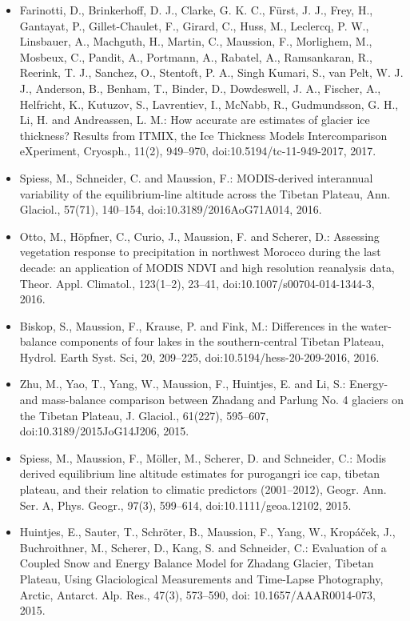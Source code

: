 \begin{footnotesize}
\begin{itemize}[nosep]
\item {} 
Farinotti, D., Brinkerhoff, D. J., Clarke, G. K. C., Fürst, J. J., Frey, H., Gantayat, P., Gillet-Chaulet, F., Girard,
C., Huss, M., Leclercq, P. W., Linsbauer, A., Machguth, H., Martin, C., Maussion, F., Morlighem, M., Mosbeux, C.,
Pandit, A., Portmann, A., Rabatel, A., Ramsankaran, R., Reerink, T. J., Sanchez, O., Stentoft, P. A., Singh Kumari,
S., van Pelt, W. J. J., Anderson, B., Benham, T., Binder, D., Dowdeswell, J. A., Fischer, A., Helfricht, K., Kutuzov,
S., Lavrentiev, I., McNabb, R., Gudmundsson, G. H., Li, H. and Andreassen, L. M.: How accurate are estimates of
glacier ice thickness? Results from ITMIX, the Ice Thickness Models Intercomparison eXperiment, Cryosph., 11(2),
949--970, doi:10.5194/tc-11-949-2017, 2017.

\item {} 
Spiess, M., Schneider, C. and Maussion, F.: MODIS-derived interannual variability of the equilibrium-line altitude
across the Tibetan Plateau, Ann. Glaciol., 57(71), 140--154, doi:10.3189/2016AoG71A014, 2016.

\item {} 
Otto, M., Höpfner, C., Curio, J., Maussion, F. and Scherer, D.: Assessing vegetation response to precipitation in
northwest Morocco during the last decade: an application of MODIS NDVI and high resolution reanalysis data, Theor.
Appl. Climatol., 123(1--2), 23--41, doi:10.1007/s00704-014-1344-3, 2016.

\item {} 
Biskop, S., Maussion, F., Krause, P. and Fink, M.: Differences in the water-balance components of four lakes in the
southern-central Tibetan Plateau, Hydrol. Earth Syst. Sci, 20, 209--225, doi:10.5194/hess-20-209-2016, 2016.

\item {} 
Zhu, M., Yao, T., Yang, W., Maussion, F., Huintjes, E. and Li, S.: Energy- and mass-balance comparison between Zhadang
and Parlung No. 4 glaciers on the Tibetan Plateau, J. Glaciol., 61(227), 595--607, \\ doi:10.3189/2015JoG14J206, 2015.

\item {} 
Spiess, M., Maussion, F., Möller, M., Scherer, D. and Schneider, C.: Modis derived equilibrium line altitude estimates
for purogangri ice cap, tibetan plateau, and their relation to climatic predictors (2001--2012), Geogr. Ann. Ser. A,
Phys. Geogr., 97(3), 599--614, doi:10.1111/geoa.12102, 2015.

\item {} 
Huintjes, E., Sauter, T., Schröter, B., Maussion, F., Yang, W., Kropáček, J., Buchroithner, M., Scherer, D., Kang, S.
and Schneider, C.: Evaluation of a Coupled Snow and Energy Balance Model for Zhadang Glacier, Tibetan Plateau, Using
Glaciological Measurements and Time-Lapse Photography, Arctic, Antarct. Alp. Res., 47(3), 573--590, doi:
10.1657/AAAR0014-073, 2015.


\end{itemize}
\end{footnotesize}

